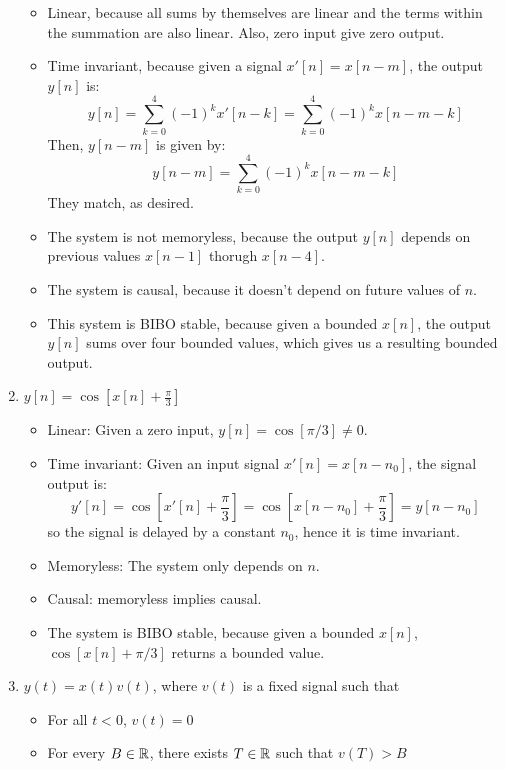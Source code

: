 \documentclass[10pt]{article}
\begin{document}
\begin{enumerate}[label=\alph*)]
			\begin{solution}
				\begin{itemize}
					\item Linear, because all sums by themselves are linear and the terms within the summation 
						are also linear. Also, zero input give zero output.
					\item Time invariant, because given a signal \( x'[n] = x[n - m] \), the output \( y[n] \) is:
						\[
							y[n] = \sum_{k = 0}^{4}(-1)^{k}x'[n - k] = \sum_{k =0}^{4}(-1)^{k}x[n - m - k]
						\] 
						Then, \( y[n - m] \) is given by: 
						\[
							y[n - m] = \sum_{k = 0}^{4}(-1)^{k}x[n - m - k]	
						\] 
						They match, as desired. 
					\item The system is not memoryless, because the output \( y[n] \) depends on previous 
						values \( x[n - 1] \) thorugh \( x[n - 4] \). 
					\item The system is causal, because it doesn't depend on future values of \( n \).  
					\item This system is BIBO stable, because given a bounded \( x[n] \), the output 
						\( y[n] \) sums over four bounded values, which gives us a resulting bounded output.
				\end{itemize}
			\end{solution}
		\item \( y[n] = \cos[x[n] + \frac{\pi}{3}] \) 

			\begin{solution}
				\begin{itemize}
					\item Linear: Given a zero input, \( y[n] = \cos[\pi / 3] \neq 0 \). 
					\item Time invariant: Given an input signal \( x'[n] = x[n - n_0] \), the signal output 
						is: 
						\[
							y'[n] = \cos\left[x'[n] + \frac{\pi}{3}\right] = 
							\cos\left[x[n - n_0] + \frac{\pi}{3}\right] = y[n - n_0]
						\] 
						so the signal is delayed by a constant \( n_0 \), hence it is time invariant. 
					\item Memoryless: The system only depends on \( n \). 
					\item Causal: memoryless implies causal.
					\item The system is BIBO stable, because given a bounded \( x[n] \), \( \cos[x[n] + \pi /3] \) 
						returns a bounded value.
				\end{itemize}
			\end{solution}
		\item \( y(t) = x(t) v(t) \), where \( v(t)  \) is a fixed signal such that 
			\begin{itemize}
				\item  For all \( t <0 \), \( v(t) = 0 \) 
				\item For every \( B \in \mathbb R \), there exists \( T \in \mathbb R \) such that \( v(T) > B \)
			\end{itemize}


\end{enumerate}
\end{document}
